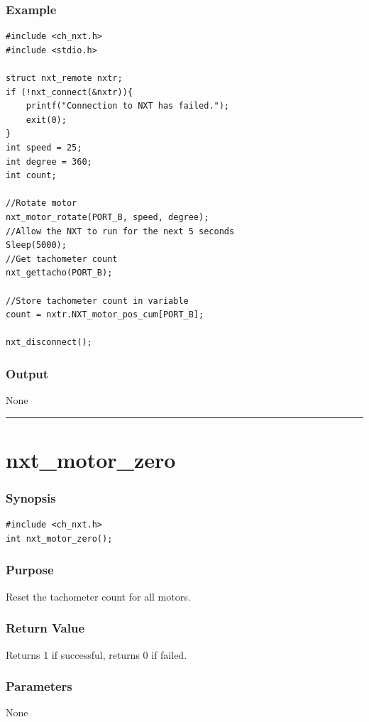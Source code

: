 \documentclass[12pt]{article}
\begin{document}
\subsubsection*{Example}
\begin{verbatim}
#include <ch_nxt.h> 
#include <stdio.h>

struct nxt_remote nxtr;
if (!nxt_connect(&nxtr)){
    printf("Connection to NXT has failed.");
    exit(0);
}
int speed = 25;
int degree = 360;
int count;
    
//Rotate motor
nxt_motor_rotate(PORT_B, speed, degree);
//Allow the NXT to run for the next 5 seconds
Sleep(5000);    
//Get tachometer count
nxt_gettacho(PORT_B);
    
//Store tachometer count in variable
count = nxtr.NXT_motor_pos_cum[PORT_B];
    
nxt_disconnect();
\end{verbatim}

\subsubsection*{Output}
None 
\\

\hrule
\newpage
\section*{nxt\_motor\_zero}

\subsubsection*{Synopsis}
\begin{verbatim}
#include <ch_nxt.h>
int nxt_motor_zero();
\end{verbatim}

\subsubsection*{Purpose}
Reset the tachometer count for all motors.

\subsubsection*{Return Value}
Returns 1 if successful, returns 0 if failed.

\subsubsection*{Parameters}
None
\end{document}

